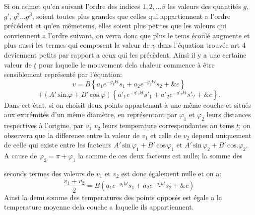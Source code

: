 \documentclass[11pt,a4paper]{article}
\begin{document}
Si on admet qu'en suivant l'ordre des indices $1, 2, \ldots \beta$ les valeurs
des quantités $g$, $g'$, $g^2 \ldots g^\beta$, soient toutes plus grandes que celles
qui appartiennent a l'ordre précédent et qu'en mêmetems, elles
soient plus petites que les valeurs qui conviennent a l'ordre
suivant, on verra donc que plus le tems écoulé augmente
et plus aussi les termes qui composent la valeur de $\underline{v}$ dans
l'équation trouvée art 4 deviennent petits par rapport a ceux
qui les précèdent. Ainsi il y a une certaine valeur de $\underline{t}$
pour laquelle le mouvement dela chaleur commence à être
sensiblement représenté par l'équation:
\[ v = B\left\{a_1e^{-g_1kt}s_1 + a_2e^{-g_2kt}s_2 + \&c\right\} \]
\[ + (A'\,\text{sin}.\varphi + B'\,\text{cos}.\varphi)\left\{a'_1e^{-g'_1kt}s'_1 + a'_2e^{-g'_2kt}s'_2 + \&c\right\}. \]
Dans cet état, si on choisit deux points appartenant à une
même couche et situés aux extrémités d'un même diamètre,
en représentant par $\varphi_1$ et $\varphi_2$ leurs distances respectives à l'origine,
par $v_1$ $v_2$ leurs temperature correspondantes au tems $\underline{t}$; on
observera que la difference entre la valeur de $v_1$ et celle de $v_2$
depend uniquement de celle qui existe entre les facteurs
$A'\,\text{sin}\,\varphi_1 + B'\,\text{cos}\,\varphi_1$ et $A'\,\text{sin}\,\varphi_2 + B'\,\text{cos}.\varphi_2$. A cause de $\varphi_2 = \pi + \varphi_1$
la somme de ces deux facteurs est nulle; la somme des


seconds termes des valeurs de $v_1$ et $v_2$ est donc également nulle et on a:
\[ \frac{v_1+v_2}{2} = B\left(a_1e^{-g_1kt}s_1 + a_2e^{-g_2kt}s_2 + \&c\right) \]
Ainsi la demi somme des temperatures des points opposés est
égale a la temperature moyenne dela couche a laquelle ils
appartiennent.
\end{document}
